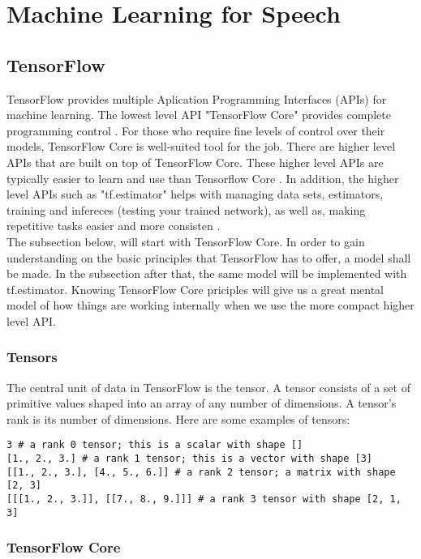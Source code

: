 \chapter{Machine Learning for Speech}\label{ch:machine_learning}

\section{TensorFlow}
TensorFlow provides multiple Aplication Programming Interfaces (APIs) for machine learning. The lowest level API "TensorFlow Core" provides complete programming control \cite{tensorflow2015-whitepaper}. For those who require fine levels of control over their models, TensorFlow Core is well-suited tool for the job. There are higher level APIs that are built on top of TensorFlow Core. These higher level APIs are typically easier to learn and use than Tensorflow Core \cite{tensorflow2015-whitepaper}. In addition, the higher level APIs such as "tf.estimator" helps with managing data sets, estimators, training and infereces (testing your trained network), as well as, making repetitive tasks easier and more consisten \cite{tensorflow2015-whitepaper}.\\

The subsection below, will start with TensorFlow Core. In order to gain understanding on the basic principles that TensorFlow has to offer, a model shall be made. In the subsection after that, the same model will be implemented with tf.estimator. Knowing TensorFlow Core priciples will give us a great mental model of how things are working internally when we use the more compact higher level API.

\subsection{Tensors}
The central unit of data in TensorFlow is the tensor. A tensor consists of a set of primitive values shaped into an array of any number of dimensions. A tensor's rank is its number of dimensions. Here are some examples of tensors:

\begin{lstlisting}
3 # a rank 0 tensor; this is a scalar with shape []
[1., 2., 3.] # a rank 1 tensor; this is a vector with shape [3]
[[1., 2., 3.], [4., 5., 6.]] # a rank 2 tensor; a matrix with shape [2, 3]
[[[1., 2., 3.]], [[7., 8., 9.]]] # a rank 3 tensor with shape [2, 1, 3]
\end{lstlisting}

\subsection{TensorFlow Core}


